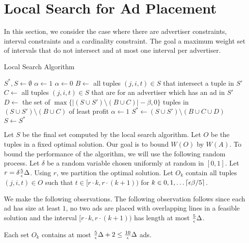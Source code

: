 

\section{Local Search for Ad Placement}

In this section, we consider the case where there are  advertiser constraints, interval constraints and a cardinality constraint.  The goal a maximum weight set of intervals that do not intersect and at most one interval per advertiser.



\begin{algorithm}[H]
\caption{Local Search Algorithm}
\begin{algorithmic}[1]
\STATE $S^*,S \leftarrow \emptyset$
\STATE $\alpha \gets 1$
\STATE $\alpha \gets 0$ 
\STATE $B \gets$ all tuples $(j,i,t) \in S$ that intersect a tuple in $S'$
\STATE $C \gets$ all tuples $(j,i,t) \in S$ that are for an advertiser which has an ad in $S'$
\STATE $D \gets$ the set of $\max\{|(S\cup S') \setminus (B\cup C)|- \beta, 0 \}$ tuples in $(S\cup S') \setminus (B\cup C)$ of least profit
\STATE $\alpha \gets 1$
\STATE $S^* \gets (S\cup S') \setminus (B\cup C\cup D)$
\ENDIF
\ENDFOR
\STATE $S \gets S^*$
\ENDWHILE
\end{algorithmic}
\end{algorithm}

Let $S$ be the final set computed by the local search algorithm.  Let $O$ be the tuples in a fixed optimal solution.  Our goal is to bound $W(O)$ by $W(A)$. To bound the performance of the algorithm, we will use the following random process.   Let $\delta$ be a random variable chosen uniformly at random in $[0,1]$.  Let $r = \delta \frac{5}{\epsilon} \Delta$.   Using $r$, we partition the optimal solution.  Let $O_k$ contain  all tuples $(j,i,t) \in O$  such that $t \in [r\cdot k, r \cdot (k+1))$ for $k \in 0, 1, \ldots \lceil \epsilon \beta / 5 \rceil$.  

We make the following observations.  The following observation follows since each ad has size at least $1$, no two ads are placed with overlapping lines in a feasible solution and the interval $[r\cdot k, r \cdot (k+1))$ has length at most $\frac{5}{\epsilon}\Delta$.

\begin{observation}
\label{obs:swapjob}
Each set $O_k$ contains at most $\frac{5}{\epsilon} \Delta +2 \leq \frac{10}{\epsilon}\Delta$ ads.  
\end{observation}

